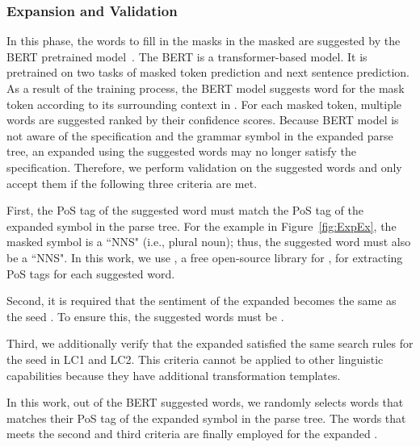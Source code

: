 \subsubsection{\Sent Expansion and Validation}

In this phase, the words to fill in the masks in the masked \sents are
suggested by the BERT pretrained model~\cite{devlin2019bert}.  The
BERT is a transformer-based \nl model. It is pretrained on two tasks
of masked token prediction and next sentence prediction. As a result
of the training process, the BERT model suggests word for the mask
token according to its surrounding context in \sent. For each masked
token, multiple words are suggested ranked by their confidence scores.
%
Because BERT model is not aware of the \lc specification and the
grammar symbol in the expanded parse tree, an expanded \sent using the
suggested words may no longer satisfy the \lc
specification. Therefore, we perform validation on the suggested words
and only accept them if the following three criteria are met.

First, the PoS tag of the suggested word must match the PoS tag of the
expanded symbol in the parse tree. For the example in
Figure~\ref{fig:ExpEx}, the masked symbol is a ``NNS" (i.e., plural
noun); thus, the suggested word must also be a ``NNS". In this work,
we use \spacy, a free open-source library for \nlp, for extracting PoS
tags for each suggested word.

Second, it is required that the sentiment of the expanded \sent
becomes the same as the seed \sent. To ensure this, the suggested
words must be \neu.

Third, we additionally verify that the expanded \sents satisfied the
same search rules for the seed \sent in LC1 and LC2. This criteria
cannot be applied to other linguistic capabilities because they have
additional transformation templates.

In this work, out of the BERT suggested words, we randomly selects
words that matches their PoS tag of the expanded symbol in the parse
tree. The words that meets the second and third criteria are finally
employed for the expanded \sents.

